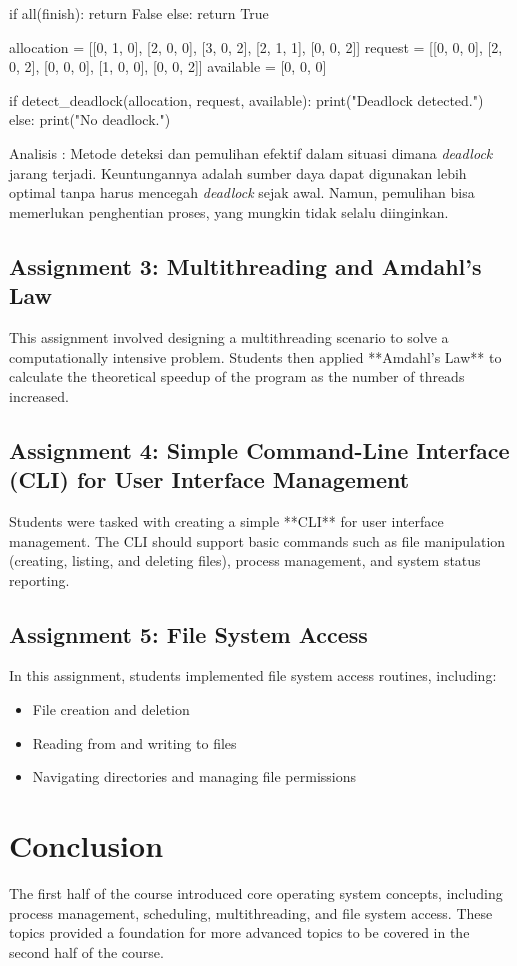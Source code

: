 \documentclass[12pt]{article}
\begin{document}
\begin{enumerate}
\begin{python}
    if all(finish):
        return False
    else:
        return True

allocation = [[0, 1, 0], [2, 0, 0], [3, 0, 2], [2, 1, 1], [0, 0, 2]]
request = [[0, 0, 0], [2, 0, 2], [0, 0, 0], [1, 0, 0], [0, 0, 2]]
available = [0, 0, 0]

if detect_deadlock(allocation, request, available):
    print("Deadlock detected.")
else:
    print("No deadlock.")
    \end{python}

    Analisis : Metode deteksi dan pemulihan efektif dalam situasi dimana \textit{deadlock} jarang terjadi. Keuntungannya adalah sumber daya dapat digunakan lebih optimal tanpa harus mencegah \textit{deadlock} sejak awal. Namun, pemulihan bisa memerlukan penghentian proses, yang mungkin tidak selalu diinginkan.
\end{enumerate}

\subsection{Assignment 3: Multithreading and Amdahl's Law}
This assignment involved designing a multithreading scenario to solve a computationally intensive problem. Students then applied **Amdahl's Law** to calculate the theoretical speedup of the program as the number of threads increased.

\subsection{Assignment 4: Simple Command-Line Interface (CLI) for User Interface Management}
Students were tasked with creating a simple **CLI** for user interface management. The CLI should support basic commands such as file manipulation (creating, listing, and deleting files), process management, and system status reporting.

\subsection{Assignment 5: File System Access}
In this assignment, students implemented file system access routines, including:
\begin{itemize}
    \item File creation and deletion
    \item Reading from and writing to files
    \item Navigating directories and managing file permissions
\end{itemize}

\section{Conclusion}
The first half of the course introduced core operating system concepts, including process management, scheduling, multithreading, and file system access. These topics provided a foundation for more advanced topics to be covered in the second half of the course.
\end{document}

